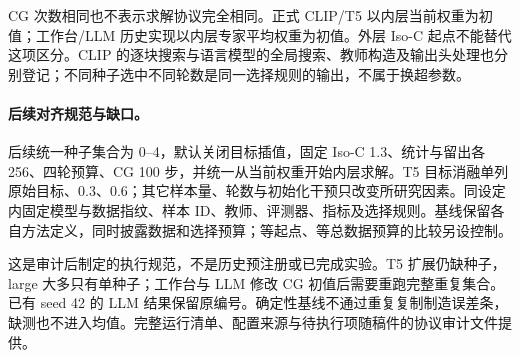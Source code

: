 CG 次数相同也不表示求解协议完全相同。正式 CLIP/T5 以内层当前权重为初值；工作台/LLM 历史实现以内层专家平均权重为初值。外层 Iso-C 起点不能替代这项区分。CLIP 的逐块搜索与语言模型的全局搜索、教师构造及输出头处理也分别登记；不同种子选中不同轮数是同一选择规则的输出，不属于换超参数。

\paragraph{后续对齐规范与缺口。}
后续统一种子集合为 0--4，默认关闭目标插值，固定 Iso-C 1.3、统计与留出各 256、四轮预算、CG 100 步，并统一从当前权重开始内层求解。T5 目标消融单列原始目标、0.3、0.6；其它样本量、轮数与初始化干预只改变所研究因素。同设定内固定模型与数据指纹、样本 ID、教师、评测器、指标及选择规则。基线保留各自方法定义，同时披露数据和选择预算；等起点、等总数据预算的比较另设控制。

这是审计后制定的执行规范，不是历史预注册或已完成实验。T5 扩展仍缺种子，large 大多只有单种子；工作台与 LLM 修改 CG 初值后需要重跑完整重复集合。已有 seed 42 的 LLM 结果保留原编号。确定性基线不通过重复复制制造误差条，缺测也不进入均值。完整运行清单、配置来源与待执行项随稿件的协议审计文件提供。
